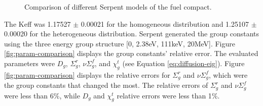 \begin{figure}[htbp!]
  \centering
  \hfill
  \caption{Comparison of different Serpent models of the fuel compact.}
  \label{fig:compact-model}
\end{figure}

The \gls{Keff} was 1.17527 $\pm$ 0.00021 for the homogeneous distribution and 1.25107 $\pm$ 0.00020 for the heterogeneous distribution.
Serpent generated the group constants using the three energy group structure [0, 2.38eV, 111keV, 20MeV].
Figure \ref{fig:param-comparison} displays the group constants' relative error.
The evaluated parameters were $D_g$, $\Sigma^r_g$, $\nu\Sigma^f_g$, and $\chi^t_g$ (see Equation \ref{eq:diffusion-eig}).
Figure \ref{fig:param-comparison} displays the relative errors for $\Sigma^r_g$ and $\nu\Sigma^f_g$, which were the group constants that changed the most.
The relative errors of $\Sigma^r_g$ and $\nu\Sigma^f_g$ were less than 6$\%$, while $D_g$ and $\chi^t_g$ relative errors were less than 1$\%$.

